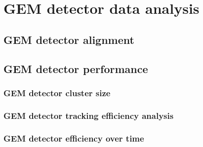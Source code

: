 \section{GEM detector data analysis}
\subsection{GEM detector alignment}
\subsection{GEM detector performance}
\subsubsection{GEM detector cluster size}
\subsubsection{GEM detector tracking efficiency analysis}
\subsubsection{GEM detector efficiency over time}
